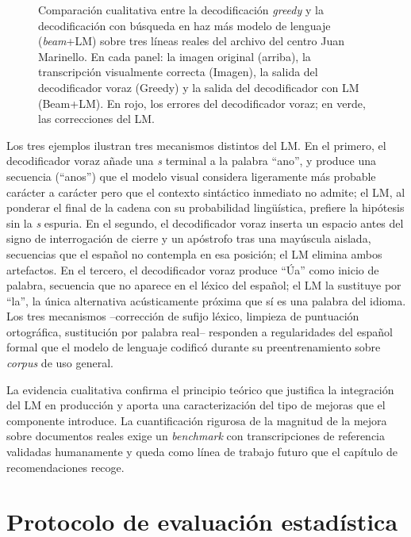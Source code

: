 \begin{figure}[!htbp]
\caption[Comparación cualitativa entre \textit{greedy} y \textit{beam}+LM sobre líneas reales.]{Comparación cualitativa entre la decodificación \textit{greedy} y la decodificación con búsqueda en haz más modelo de lenguaje (\textit{beam}+LM) sobre tres líneas reales del archivo del centro Juan Marinello. En cada panel: la imagen original (arriba), la transcripción visualmente correcta (Imagen), la salida del decodificador voraz (Greedy) y la salida del decodificador con LM (Beam+LM). En rojo, los errores del decodificador voraz; en verde, las correcciones del LM.}
\label{fig:kenlm-cualitativo}
\end{figure}

Los tres ejemplos ilustran tres mecanismos distintos del LM. En el primero, el decodificador voraz añade una \emph{s} terminal a la palabra ``ano'', y produce una secuencia (``anos'') que el modelo visual considera ligeramente más probable carácter a carácter pero que el contexto sintáctico inmediato no admite; el LM, al ponderar el final de la cadena con su probabilidad lingüística, prefiere la hipótesis sin la \emph{s} espuria. En el segundo, el decodificador voraz inserta un espacio antes del signo de interrogación de cierre y un apóstrofo tras una mayúscula aislada, secuencias que el español no contempla en esa posición; el LM elimina ambos artefactos. En el tercero, el decodificador voraz produce ``Úa'' como inicio de palabra, secuencia que no aparece en el léxico del español; el LM la sustituye por ``la'', la única alternativa acústicamente próxima que sí es una palabra del idioma. Los tres mecanismos --corrección de sufijo léxico, limpieza de puntuación ortográfica, sustitución por palabra real-- responden a regularidades del español formal que el modelo de lenguaje codificó durante su preentrenamiento sobre \textit{corpus} de uso general.

La evidencia cualitativa confirma el principio teórico que justifica la integración del LM en producción y aporta una caracterización del tipo de mejoras que el componente introduce. La cuantificación rigurosa de la magnitud de la mejora sobre documentos reales exige un \textit{benchmark} con transcripciones de referencia validadas humanamente y queda como línea de trabajo futuro que el capítulo de recomendaciones recoge.

\section{Protocolo de evaluación estadística}
\label{sec:evaluacion-estadistica}

